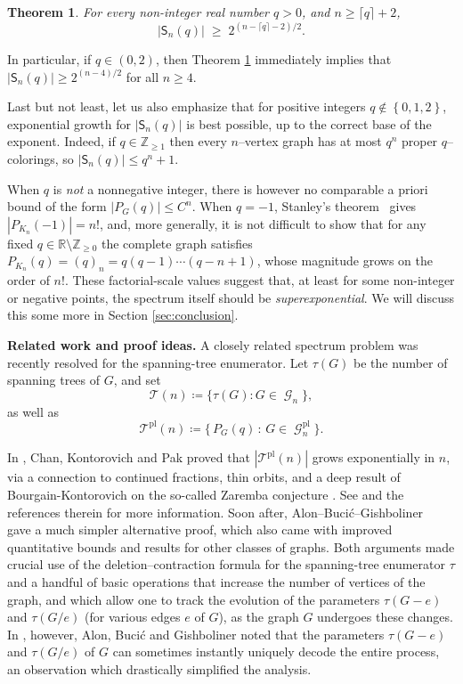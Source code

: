 \documentclass[A4paper,reqno,oneside,12pt]{amsart}
\theoremstyle{plain}
\newtheorem{theorem}{Theorem}[section]
\theoremstyle{definition}
\newcommand{\abs}[1]{\left| #1 \right|}
\DeclareMathOperator{\pl}{\mathrm{pl}}
\DeclareMathOperator{\mG}{\mathcal{G}}
\begin{document}
\begin{theorem}\label{thm:main}
For every non-integer real number $q > 0$, and $n\ge \lceil q\rceil+2$, 
$$|\mathsf{S}_n(q)| \;\ge\; 2^{(n-\lceil q\rceil-2)/2}.$$
\end{theorem}

In particular, if $q \in (0,2)$, then Theorem \ref{thm:main} immediately implies that $|\mathsf{S}_n(q)| \ge 2^{(n-4)/2}$ for all $n\ge 4$. 

Last but not least, let us also emphasize that for positive integers $q \not\in \left\{0,1,2\right\}$, exponential growth for $\abs{\mathsf{S}_n(q)}$ is best possible, up to the correct base of the exponent. Indeed, if $q\in\mathbb{Z}_{\ge 1}$ then every $n$--vertex graph has at most $q^n$ proper $q$--colorings, so $|\mathsf{S}_n(q)|\le q^n+1$. 

When $q$ is \emph{not} a nonnegative integer, there is however no comparable a priori bound of the form $|P_G(q)|\le C^n$.
When $q=-1$, Stanley's theorem~\cite{Stanley1973} gives $|P_{K_n}(-1)|=n!$, and, more generally, it is not difficult to show that for any fixed $q\in\mathbb{R}\setminus\mathbb{Z}_{\ge 0}$ the complete graph satisfies
$P_{K_n}(q)=(q)_n=q(q-1)\cdots(q-n+1)$, whose magnitude grows on the order of $n!$.
These factorial-scale values suggest that, at least for some non-integer or negative points, the spectrum itself should be \emph{superexponential}. We will discuss this some more in Section \ref{sec:conclusion}.

\vspace{+3mm}
\noindent\textbf{Related work and proof ideas.}
A closely related spectrum problem was recently resolved for the spanning-tree enumerator.
Let $\tau(G)$ be the number of spanning trees of $G$, and set
\[
\mathcal{T}(n)\coloneqq \{\tau(G): G \in \mG_n \},
\]
as well as
\begin{equation*}
    \mathcal{T}^{\pl}(n) \coloneqq \{\, P_G(q) \, : \, G \in \mG_n^{\pl} \}.
\end{equation*}

In \cite{ChanKontorovichPak24trees}, Chan, Kontorovich and Pak proved that $|\mathcal{T}^{\pl}(n)|$ grows exponentially in $n$, via a connection to continued fractions, thin orbits, and a deep result of Bourgain-Kontorovich \cite{BourgainKontorovich14} on the so-called Zaremba conjecture \cite{Zaremba72}. See \cite{ChanKontorovichPak24trees} and the references therein for more information. Soon after, Alon--Buci\'c--Gishboliner~\cite{ABG} gave a much simpler alternative proof, which also came with improved quantitative bounds and results for other classes of graphs. Both arguments made crucial use of the deletion--contraction formula for the spanning-tree enumerator $\tau$ and a handful of basic operations that increase the number of vertices of the graph, and which allow one to track the evolution of the parameters $\tau(G-e)$ and $\tau(G/e)$ (for various edges $e$ of $G$), as the graph $G$ undergoes these changes. In \cite{ABG}, however, Alon, Buci\'c and Gishboliner noted that the parameters $\tau(G-e)$ and $\tau(G/e)$ of $G$ can sometimes instantly uniquely decode the entire process, an observation which drastically simplified the analysis. 
\end{document}
